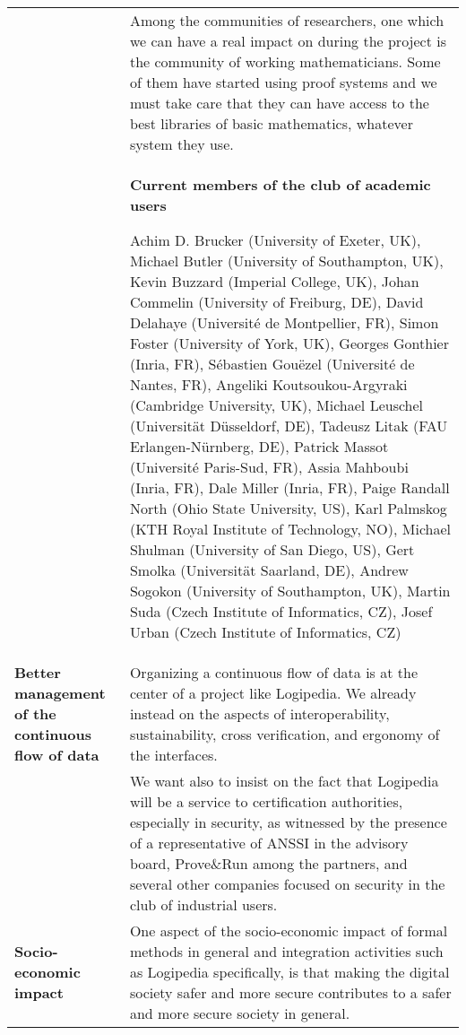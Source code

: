 \begin{longtable}{|p{}|p{}|}
&
\hspace{0.4cm}
Among the communities of researchers, one which we can have a real
impact on during the project is the community of working mathematicians.
Some of them have started using proof systems and we must take care that they
can have access to the best libraries of basic mathematics, whatever system
they use.\\
&
\begin{framed}
\begin{center}
  {\bf \Large Current members of the club of academic users}
\end{center}
Achim D. Brucker (University of Exeter, UK),
Michael Butler (University of Southampton, UK),
Kevin Buzzard (Imperial College, UK),
Johan Commelin (University of Freiburg, DE),
David Delahaye (Université de Montpellier, FR),
Simon Foster (University of York, UK),
Georges Gonthier (Inria, FR),
Sébastien Gouëzel (Université de Nantes, FR),
Angeliki Koutsoukou-Argyraki (Cambridge University, UK),
Michael Leuschel (Universität Düsseldorf, DE),
Tadeusz Litak (FAU Erlangen-Nürnberg, DE),
Patrick Massot (Université Paris-Sud, FR),
Assia Mahboubi (Inria, FR),
Dale Miller (Inria, FR),
Paige Randall North (Ohio State University, US),
Karl Palmskog (KTH Royal Institute of Technology, NO),
Michael Shulman (University of San Diego, US),
Gert Smolka (Universität Saarland, DE),
Andrew Sogokon (University of Southampton, UK),
Martin Suda (Czech Institute of Informatics, CZ),
Josef Urban (Czech Institute of Informatics, CZ)
\end{framed}\\
\hline
    {\bf Better management of the continuous flow of data}
    &
Organizing a continuous flow of data is at the center of a project
like Logipedia. We already instead on the aspects of interoperability,
sustainability, cross verification, and ergonomy of the interfaces.\\

&
\hspace{0.4cm}
We want also to insist on the fact that Logipedia will be a service to
certification authorities, especially in security, as witnessed by the
presence of a representative of ANSSI in the advisory board,
Prove\&Run among the partners, and several other companies focused on
security in the club of industrial users.\\
\hline
{\bf Socio-economic impact}
&
One aspect of the socio-economic impact of formal methods in general
and integration activities such as Logipedia specifically, is that making the
digital society safer and more secure contributes to a safer and more
secure society in general.\\


\end{longtable}

